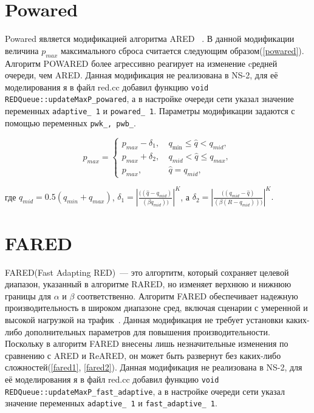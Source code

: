  
\section{Powared}

Powared является модификацией алгоритма ARED ~\citep{Powared}. В данной модификации величина $p_{max}$ максимального сброса считается следующим образом(\ref{powared}). Алгоритм POWARED более агрессивно реагирует на изменение cредней очереди, чем ARED. Данная модификация не реализована в NS-2, для её моделирования я в файл red.cc добавил функцию \verb|void REDQueue::updateMaxP_powared|, а в настройке очереди сети указал значение переменных \verb|adaptive_ 1| и \verb|powared_ 1|. 
Параметры модификации задаются с помощью переменных \verb|pwk_, pwb_|.

\begin{equation}
\label{powared}
p_{max} =\begin{cases}
        p_{max}-\delta_1, &  \  q_{\min} \leqslant \hat{q} < q_{mid}, 
        \\
        p_{max}+\delta_2, & \ q_{mid} < \hat{q}  \leqslant q_{max}, 
        \\
        p_{max}, &  \ \hat{q} =  q_{mid},
\end{cases}
\end{equation}

где $q_{mid} = 0.5(q_{min} + q_{max})$, 
$\delta_1 = |\frac{((\hat{q} - q_{mid})}{(\beta q_{mid}))}|^K $, а $\delta_2 = |\frac{((q_{mid} - \hat{q})}{(\beta (R -q_{mid})))}|^K.$


\section{FARED}

FARED(Fast Adapting RED)~--- это алгортитм, который сохраняет целевой диапазон, указанный в алгоритме RARED, но изменяет верхнюю и нижнюю границы для $\alpha $ и $\beta$ соответственно. Алгоритм FARED обеспечивает надежную производительность в широком диапазоне сред, включая сценарии с умеренной и высокой нагрузкой на трафик~\citep{Tahiliani_2012}.
Данная модификация не требует установки каких-либо дополнительных параметров для повышения производительности. Поскольку в алгоритм FARED внесены лишь незначительные изменения по сравнению
с ARED и ReARED, он может быть развернут без каких-либо сложностей(\ref{fared1}, \ref{fared2}). Данная модификация не реализована в NS-2, для её моделирования я в файл red.cc добавил функцию \verb|void REDQueue::updateMaxP_fast_adaptive|, а в настройке очереди сети указал значение переменных \verb|adaptive_ 1| 
и \verb|fast_adaptive_ 1|. 

